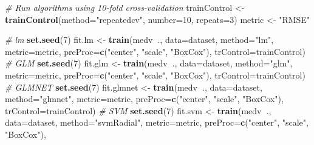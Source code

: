 \documentclass[]{book}
\newenvironment{Shaded}{\begin{snugshade}}{\end{snugshade}}
\newcommand{\CommentTok}[1]{\textcolor[rgb]{0.56,0.35,0.01}{\textit{#1}}}
\newcommand{\DataTypeTok}[1]{\textcolor[rgb]{0.13,0.29,0.53}{#1}}
\newcommand{\DecValTok}[1]{\textcolor[rgb]{0.00,0.00,0.81}{#1}}
\newcommand{\KeywordTok}[1]{\textcolor[rgb]{0.13,0.29,0.53}{\textbf{#1}}}
\newcommand{\NormalTok}[1]{#1}
\newcommand{\OperatorTok}[1]{\textcolor[rgb]{0.81,0.36,0.00}{\textbf{#1}}}
\newcommand{\StringTok}[1]{\textcolor[rgb]{0.31,0.60,0.02}{#1}}
\begin{document}
\begin{Shaded}
\begin{Highlighting}[]
\CommentTok{# Run algorithms using 10-fold cross-validation}
\NormalTok{trainControl <-}\StringTok{ }\KeywordTok{trainControl}\NormalTok{(}\DataTypeTok{method=}\StringTok{"repeatedcv"}\NormalTok{, }\DataTypeTok{number=}\DecValTok{10}\NormalTok{, }\DataTypeTok{repeats=}\DecValTok{3}\NormalTok{)}
\NormalTok{metric <-}\StringTok{ "RMSE"}

\CommentTok{# lm}
\KeywordTok{set.seed}\NormalTok{(}\DecValTok{7}\NormalTok{)}
\NormalTok{fit.lm <-}\StringTok{ }\KeywordTok{train}\NormalTok{(medv}\OperatorTok{~}\NormalTok{., }\DataTypeTok{data=}\NormalTok{dataset, }\DataTypeTok{method=}\StringTok{"lm"}\NormalTok{, }\DataTypeTok{metric=}\NormalTok{metric, }
                \DataTypeTok{preProc=}\KeywordTok{c}\NormalTok{(}\StringTok{"center"}\NormalTok{, }\StringTok{"scale"}\NormalTok{, }\StringTok{"BoxCox"}\NormalTok{), }
                \DataTypeTok{trControl=}\NormalTok{trainControl)}
\CommentTok{# GLM}
\KeywordTok{set.seed}\NormalTok{(}\DecValTok{7}\NormalTok{)}
\NormalTok{fit.glm <-}\StringTok{ }\KeywordTok{train}\NormalTok{(medv}\OperatorTok{~}\NormalTok{., }\DataTypeTok{data=}\NormalTok{dataset, }\DataTypeTok{method=}\StringTok{"glm"}\NormalTok{, }\DataTypeTok{metric=}\NormalTok{metric, }
                 \DataTypeTok{preProc=}\KeywordTok{c}\NormalTok{(}\StringTok{"center"}\NormalTok{, }\StringTok{"scale"}\NormalTok{, }\StringTok{"BoxCox"}\NormalTok{), }
                 \DataTypeTok{trControl=}\NormalTok{trainControl)}
\CommentTok{# GLMNET}
\KeywordTok{set.seed}\NormalTok{(}\DecValTok{7}\NormalTok{)}
\NormalTok{fit.glmnet <-}\StringTok{ }\KeywordTok{train}\NormalTok{(medv}\OperatorTok{~}\NormalTok{., }\DataTypeTok{data=}\NormalTok{dataset, }\DataTypeTok{method=}\StringTok{"glmnet"}\NormalTok{, }\DataTypeTok{metric=}\NormalTok{metric, }
                    \DataTypeTok{preProc=}\KeywordTok{c}\NormalTok{(}\StringTok{"center"}\NormalTok{, }\StringTok{"scale"}\NormalTok{, }\StringTok{"BoxCox"}\NormalTok{),}
                    \DataTypeTok{trControl=}\NormalTok{trainControl)}
\CommentTok{# SVM}
\KeywordTok{set.seed}\NormalTok{(}\DecValTok{7}\NormalTok{)}
\NormalTok{fit.svm <-}\StringTok{ }\KeywordTok{train}\NormalTok{(medv}\OperatorTok{~}\NormalTok{., }\DataTypeTok{data=}\NormalTok{dataset, }\DataTypeTok{method=}\StringTok{"svmRadial"}\NormalTok{, }\DataTypeTok{metric=}\NormalTok{metric, }
                 \DataTypeTok{preProc=}\KeywordTok{c}\NormalTok{(}\StringTok{"center"}\NormalTok{, }\StringTok{"scale"}\NormalTok{, }\StringTok{"BoxCox"}\NormalTok{),}

\end{Highlighting}
\end{Shaded}
\end{document}
